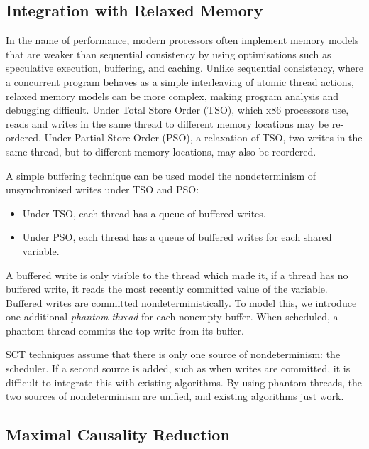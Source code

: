 \subsection{Integration with Relaxed Memory}

In the name of performance, modern processors often implement memory models that
are weaker than sequential consistency\cite{lamport1979} by using optimisations
such as speculative execution, buffering, and caching.  Unlike sequential
consistency, where a concurrent program behaves as a simple interleaving of
atomic thread actions, relaxed memory models can be more complex, making program
analysis and debugging difficult. Under Total Store Order (TSO), which x86
processors use\cite{owens2009}, reads and writes in the same thread to
different memory locations may be re-ordered.  Under Partial Store Order (PSO),
a relaxation of TSO\cite{sparc}, two writes in the same thread, but to different
memory locations, may also be reordered.

A simple buffering technique can be used model the nondeterminism of
unsynchronised writes under TSO and PSO\cite{zhang2015}:

\begin{itemize}
\item Under TSO, each thread has a queue of buffered writes.
\item Under PSO, each thread has a queue of buffered writes for each shared
variable.
\end{itemize}

A buffered write is only visible to the thread which made it, if a thread has no
buffered write, it reads the most recently committed value of the variable.
Buffered writes are committed nondeterministically.  To model this, we introduce
one additional \emph{phantom thread} for each nonempty buffer.  When scheduled,
a phantom thread commits the top write from its buffer.

SCT techniques assume that there is only one source of nondeterminism: the
scheduler.  If a second source is added, such as when writes are committed, it
is difficult to integrate this with existing algorithms.  By using phantom
threads, the two sources of nondeterminism are unified, and existing algorithms
just work\cite{zhang2015}.

\subsection{Maximal Causality Reduction}

